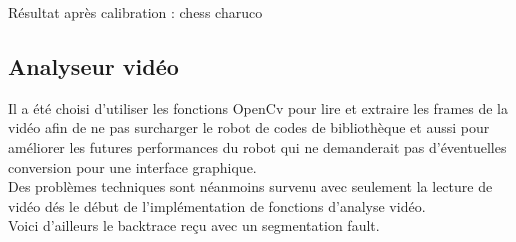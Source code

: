 \documentclass{article}
\begin{document}
Résultat après calibration :
chess
charuco

\newpage
\subsection{Analyseur vidéo}

Il a été choisi d'utiliser les fonctions OpenCv pour lire et extraire les frames de la vidéo afin de ne pas surcharger le robot de codes de bibliothèque et aussi pour améliorer les futures performances du robot qui ne demanderait pas d'éventuelles conversion pour une interface graphique.\\

Des problèmes techniques sont néanmoins survenu avec seulement la lecture de vidéo dés le début de l’implémentation de fonctions d'analyse vidéo.\\

Voici d'ailleurs le backtrace reçu avec un segmentation fault.\\
\end{document}
